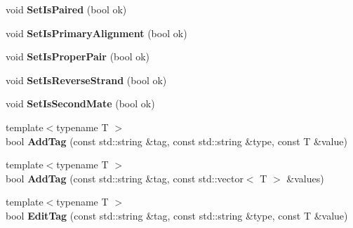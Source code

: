 \begin{DoxyCompactItemize}
\item 
\hypertarget{structBamTools_1_1BamAlignment_a4be9b3d2b44a353ebc36edf3492aa141}{void {\bfseries Set\-Is\-Paired} (bool ok)}\label{structBamTools_1_1BamAlignment_a4be9b3d2b44a353ebc36edf3492aa141}

\item 
\hypertarget{structBamTools_1_1BamAlignment_a86bed533fe9ac00e66ef7ff4844941ba}{void {\bfseries Set\-Is\-Primary\-Alignment} (bool ok)}\label{structBamTools_1_1BamAlignment_a86bed533fe9ac00e66ef7ff4844941ba}

\item 
\hypertarget{structBamTools_1_1BamAlignment_a51c74aff2a0a9693bb69a69e700f623e}{void {\bfseries Set\-Is\-Proper\-Pair} (bool ok)}\label{structBamTools_1_1BamAlignment_a51c74aff2a0a9693bb69a69e700f623e}

\item 
\hypertarget{structBamTools_1_1BamAlignment_a49822bb3085e033edd7b8a8d1824bf7b}{void {\bfseries Set\-Is\-Reverse\-Strand} (bool ok)}\label{structBamTools_1_1BamAlignment_a49822bb3085e033edd7b8a8d1824bf7b}

\item 
\hypertarget{structBamTools_1_1BamAlignment_a0179dbf84b9dfacfcef38744e4bff8b8}{void {\bfseries Set\-Is\-Second\-Mate} (bool ok)}\label{structBamTools_1_1BamAlignment_a0179dbf84b9dfacfcef38744e4bff8b8}

\item 
\hypertarget{structBamTools_1_1BamAlignment_a553f81130bf6e136ae8859bb89011c71}{{\footnotesize template$<$typename T $>$ }\\bool {\bfseries Add\-Tag} (const std\-::string \&tag, const std\-::string \&type, const T \&value)}\label{structBamTools_1_1BamAlignment_a553f81130bf6e136ae8859bb89011c71}

\item 
\hypertarget{structBamTools_1_1BamAlignment_ab09155dbfea4f7ab1c86eb31ffdcae47}{{\footnotesize template$<$typename T $>$ }\\bool {\bfseries Add\-Tag} (const std\-::string \&tag, const std\-::vector$<$ T $>$ \&values)}\label{structBamTools_1_1BamAlignment_ab09155dbfea4f7ab1c86eb31ffdcae47}

\item 
\hypertarget{structBamTools_1_1BamAlignment_af70ac92ef127712790dff1cddfb3bccd}{{\footnotesize template$<$typename T $>$ }\\bool {\bfseries Edit\-Tag} (const std\-::string \&tag, const std\-::string \&type, const T \&value)}\label{structBamTools_1_1BamAlignment_af70ac92ef127712790dff1cddfb3bccd}


\end{DoxyCompactItemize}
